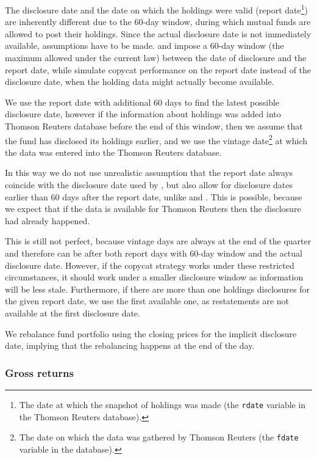 \documentclass[12pt, a4]{article}
\begin{document}
The disclosure date and the date on which the holdings were valid (report date\footnote{The date at which the snapshot of holdings was made (the \texttt{rdate} variable in the Thomson Reuters database).}) are inherently different due to the 60-day window, during which mutual funds are allowed to post their holdings. Since the actual disclosure date is not immediately available, assumptions have to be made. \cite{verbeek} and \cite{frank} impose a 60-day window (the maximum allowed under the current law) between the date of disclosure and the report date, while \citeauthor{kacperczyk} simulate copycat performance on the report date instead of the disclosure date, when the holding data might actually become available. 

We use the report date with additional 60 days to find the latest possible disclosure date, however if the information about holdings was added into Thomson Reuters database before the end of this window, then we assume that the fund has disclosed its holdings earlier, and we use the vintage date\footnote{The date on which the data was gathered by Thomson Reuters (the \texttt{fdate} variable in the database).} at which the data was entered into the Thomson Reuters database. 

In this way we do not use unrealistic assumption that the report date always coincide with the disclosure date used by \cite{kacperczyk}, but also allow for disclosure dates earlier than 60 days after the report date, unlike \cite{verbeek} and \cite{frank}. This is possible, because we expect that if the data is available for Thomson Reuters then the disclosure had already happened.

This is still not perfect, because vintage days are always at the end of the quarter and therefore can be after both report days with 60-day window and the actual disclosure date. However, if the copycat strategy works under these restricted circumstances, it should work under a smaller disclosure window as information will be less stale. Furthermore, if there are more than one holdings disclosures for the given report date, we use the first available one, as restatements are not available at the first disclosure date.

We rebalance fund portfolio using the closing prices for the implicit disclosure date, implying that the rebalancing happens at the end of the day.

\subsubsection{Gross returns}
\end{document}
